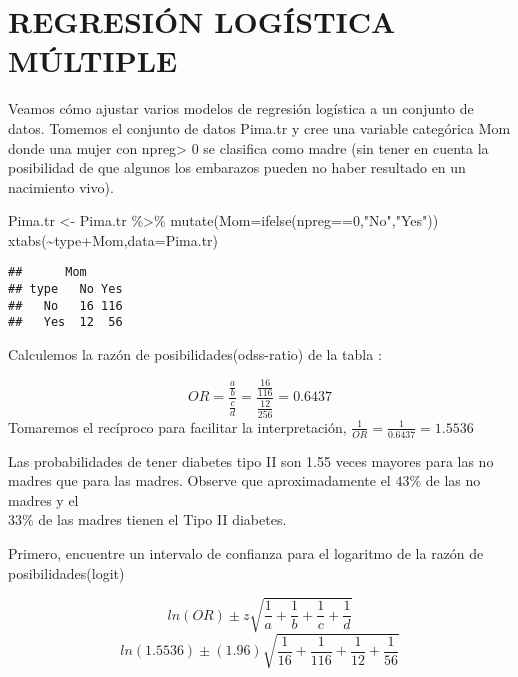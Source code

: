 \documentclass[
]{book}
\newenvironment{Shaded}{\begin{snugshade}}{\end{snugshade}}
\newcommand{\AttributeTok}[1]{\textcolor[rgb]{0.77,0.63,0.00}{#1}}
\newcommand{\DecValTok}[1]{\textcolor[rgb]{0.00,0.00,0.81}{#1}}
\newcommand{\FunctionTok}[1]{\textcolor[rgb]{0.00,0.00,0.00}{#1}}
\newcommand{\NormalTok}[1]{#1}
\newcommand{\OtherTok}[1]{\textcolor[rgb]{0.56,0.35,0.01}{#1}}
\newcommand{\SpecialCharTok}[1]{\textcolor[rgb]{0.00,0.00,0.00}{#1}}
\newcommand{\StringTok}[1]{\textcolor[rgb]{0.31,0.60,0.02}{#1}}
\begin{document}
\hypertarget{regresiuxf3n-loguxedstica-muxfaltiple}{%
\chapter{REGRESIÓN LOGÍSTICA MÚLTIPLE}\label{regresiuxf3n-loguxedstica-muxfaltiple}}

Veamos cómo ajustar varios modelos de regresión logística a un conjunto de datos. Tomemos
el conjunto de datos Pima.tr y cree una variable categórica Mom donde una mujer
con npreg\textgreater{} 0 se clasifica como madre (sin tener en cuenta la posibilidad de que algunos
los embarazos pueden no haber resultado en un nacimiento vivo).

\begin{Shaded}
\begin{Highlighting}[]
\NormalTok{Pima.tr }\OtherTok{\textless{}{-}}\NormalTok{ Pima.tr }\SpecialCharTok{\%\textgreater{}\%}
\FunctionTok{mutate}\NormalTok{(}\AttributeTok{Mom=}\FunctionTok{ifelse}\NormalTok{(npreg}\SpecialCharTok{==}\DecValTok{0}\NormalTok{,}\StringTok{"No"}\NormalTok{,}\StringTok{"Yes"}\NormalTok{))}
\FunctionTok{xtabs}\NormalTok{(}\SpecialCharTok{\textasciitilde{}}\NormalTok{type}\SpecialCharTok{+}\NormalTok{Mom,}\AttributeTok{data=}\NormalTok{Pima.tr)}
\end{Highlighting}
\end{Shaded}

\begin{verbatim}
##      Mom
## type   No Yes
##   No   16 116
##   Yes  12  56
\end{verbatim}

Calculemos la razón de posibilidades(odss-ratio) de la tabla :

\[ OR=\dfrac{\frac{a}{b}}{\frac{c}{d}}=\dfrac{\frac{16}{116}}{\frac{12}{256}}=0.6437\]
Tomaremos el recíproco para facilitar la interpretación, \(\frac{1}{OR}=\frac{1}{0.6437}=1.5536\)

Las probabilidades
de tener diabetes tipo II son 1.55 veces mayores para las no madres que para las madres.
Observe que aproximadamente el \(43\%\) de las no madres y el\\
\(33\%\) de las madres tienen el Tipo II diabetes.

Primero, encuentre un intervalo de confianza para el logaritmo de la razón de posibilidades(logit)

\[ln(OR)\pm z\sqrt{\frac{1}{a}+\frac{1}{b}+\frac{1}{c}+\frac{1}{d} }\]
\[ln(1.5536)\pm (1.96)\sqrt{\frac{1}{16}+\frac{1}{116}+\frac{1}{12}+\frac{1}{56}} \]
\end{document}
